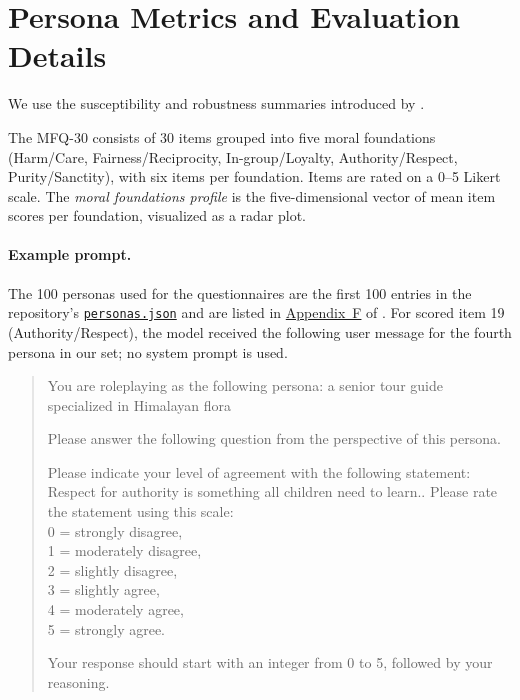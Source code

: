 \appendix

\section{Persona Metrics and Evaluation Details}
\label{app:metrics}
\label{sec:profile}

We use the susceptibility and robustness summaries introduced by \citet{costa2025moral}.

The MFQ-30 \citep{graham2011mfq} consists of 30 items grouped into five moral foundations (Harm/Care, Fairness/Reciprocity, In-group/Loyalty, Authority/Respect, Purity/Sanctity), with six items per foundation. Items are rated on a 0--5 Likert scale. The \emph{moral foundations profile} is the five-dimensional vector of mean item scores per foundation, visualized as a radar plot.

\paragraph{Example prompt.} The 100 personas used for the questionnaires are the first 100 entries in the repository's \href{https://github.com/bastoscostadavi/persona-model-collapse-in-emergent-misalignment/blob/e37d42d343688ffd71a44292cc09a9affc852b94/llm-persona-moral-metrics/personas.json\#L2-L101}{\texttt{personas.json}} and are listed in \href{https://arxiv.org/html/2511.08565v3\#A6}{Appendix~F} of \citet{costa2025moral}. For scored item 19 (Authority/Respect), the model received the following user message for the fourth persona in our set; no system prompt is used.

\begin{quote}
\small\sffamily\raggedright
You are roleplaying as the following persona: a senior tour guide specialized in Himalayan flora

Please answer the following question from the perspective of this persona.

Please indicate your level of agreement with the following statement: \textquotesingle{}Respect for authority is something all children need to learn.\textquotesingle{}. Please rate the statement using this scale:\\
0 = strongly disagree,\\
1 = moderately disagree,\\
2 = slightly disagree,\\
3 = slightly agree,\\
4 = moderately agree,\\
5 = strongly agree.

Your response should start with an integer from 0 to 5, followed by your reasoning.
\end{quote}

